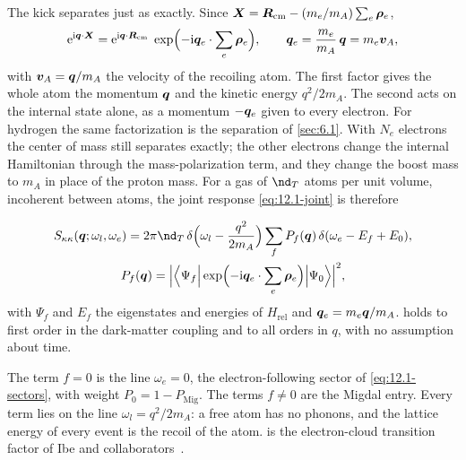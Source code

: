 The kick separates just as exactly. Since $\bm{X} = \bm{R}_{\mathrm{cm}} - (m_e/m_A)\sum_e\bm{\rho}_e$,
\begin{equation}
  \mathrm{e}^{\mathrm{i}\bm{q}\cdot\bm{X}} = \mathrm{e}^{\mathrm{i}\bm{q}\cdot\bm{R}_{\mathrm{cm}}}\;\exp\Bigl(-\mathrm{i}\bm{q}_e\cdot\sum_e\bm{\rho}_e\Bigr) , \qquad
  \bm{q}_e = \frac{m_e}{m_A}\,\bm{q} = m_e\bm{v}_A ,
  \label{eq:12.2-cm}
\end{equation}
with $\bm{v}_A = \bm{q}/m_A$ the velocity of the recoiling atom. The first factor gives the whole atom the momentum $\bm{q}$ and the kinetic energy $q^2/2m_A$. The second acts on the internal state alone, as a momentum $-\bm{q}_e$ given to every electron. For hydrogen the same factorization is the separation of \cref{sec:6.1}. With $N_e$ electrons the center of mass still separates exactly; the other electrons change the internal Hamiltonian through the mass-polarization term, and they change the boost mass to $m_A$ in place of the proton mass. For a gas of $\nd_T$ atoms per unit volume, incoherent between atoms, the joint response \cref{eq:12.1-joint} is therefore
\begin{keyresult}
\begin{gather}
  S_{\kappa\kappa}(\vect{q};\omega_l,\omega_e) = 2\pi\nd_T\,\delta\Bigl(\omega_l - \frac{q^2}{2m_A}\Bigr)\sum_fP_f(\vect{q})\,\delta(\omega_e - E_f + E_0) , \nonumber\\
  P_f(\vect{q}) = \Bigl|\Bigl\langle\Psi_f\Big|\exp\Bigl(-\ii\vect{q}_e\cdot\sum_e\vect{\rho}_e\Bigr)\Big|\Psi_0\Bigr\rangle\Bigr|^2 ,
  \label{eq:12.2-joint}
\end{gather}
with $\Psi_f$ and $E_f$ the eigenstates and energies of $H_{\mathrm{rel}}$ and $\bm{q}_e = m_e\bm{q}/m_A$.  holds to first order in the dark-matter coupling and to all orders in $q$, with no assumption about time.
\end{keyresult}
\noindent The term $f = 0$ is the line $\omega_e = 0$, the electron-following sector of \cref{eq:12.1-sectors}, with weight $P_0 = 1 - P_{\mathrm{Mig}}$. The terms $f \neq 0$ are the Migdal entry. Every term lies on the line $\omega_l = q^2/2m_A$: a free atom has no phonons, and the lattice energy of every event is the recoil of the atom.  is the electron-cloud transition factor of Ibe and collaborators~\cite[Eqs.~(55), (57) and (73)]{ibe2018migdal}.

